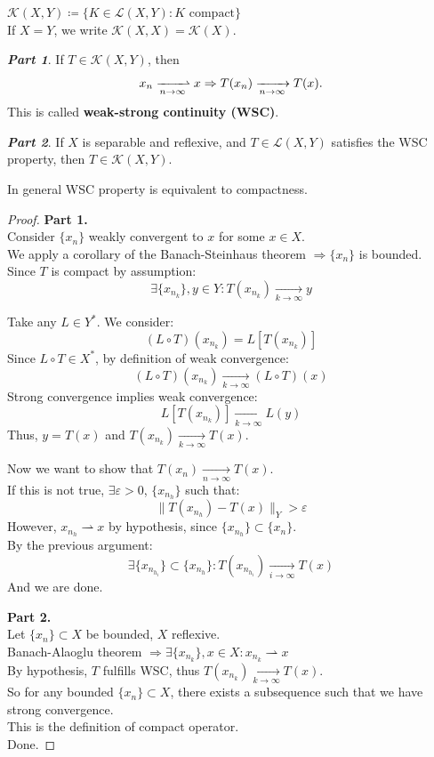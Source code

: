 \begin{definition}
$\mathcal{K}(X, Y) \coloneqq \{K \in \mathcal{L}(X, Y) : K \text{ compact}\}$ \\
If $X = Y$, we write $\mathcal{K}(X, X) = \mathcal{K}(X)$.
\end{definition}

\clearpage
\begin{theorem}
\textbf{\textit{Part 1}}. If $T \in \mathcal{K}(X, Y)$, then
\[
x_n \xrightharpoonup[n \to \infty]{} x \Rightarrow T(x_n) \xrightarrow[n \to \infty]{} T(x).
\]
This is called \textbf{weak-strong continuity (WSC)}.

\vspace{5pt}
\textbf{\textit{Part 2}}. If $X$ is separable and reflexive, and $T \in \mathcal{L}(X, Y)$ satisfies the WSC property, then $T \in \mathcal{K}(X, Y)$.
\end{theorem}

\begin{remark}
In general WSC property is equivalent to compactness.
\end{remark}

\begin{proof}
\textbf{Part 1.} \\
Consider $\{x_n\}$ weakly convergent to $x$ for some $x \in X$. \\
We apply a corollary of the Banach-Steinhaus theorem $\Rightarrow \{x_n\}$ is bounded. \\
Since $T$ is compact by assumption:
\[
\exists \{x_{n_k}\}, y \in Y : T(x_{n_k}) \xrightarrow[k \to \infty]{} y
\]

Take any $L \in Y^*$. We consider:
\[
(L \circ T)(x_{n_k}) = L[T(x_{n_k})]
\]
Since $L \circ T \in X^*$, by definition of weak convergence:
\[
(L \circ T)(x_{n_k}) \xrightarrow[k \to \infty]{} (L \circ T)(x)
\]
Strong convergence implies weak convergence:
\[
L[T(x_{n_k})] \xrightarrow[k \to \infty]{} L(y)
\]
Thus, $y = T(x)$ and $T(x_{n_k}) \xrightarrow[k \to \infty]{} T(x)$.

Now we want to show that $T(x_n) \xrightarrow[n \to \infty]{} T(x)$. \\
If this is not true, $\exists \varepsilon > 0$, $\{x_{n_h}\}$ such that:
\[
\|T(x_{n_h}) - T(x)\|_Y > \varepsilon
\]
However, $x_{n_h} \rightharpoonup x$ by hypothesis, since $\{x_{n_h}\} \subset \{x_n\}$. \\
By the previous argument:
\[
\exists \{x_{n_{h_i}}\} \subset \{x_{n_h}\} : T(x_{n_{h_i}}) \xrightarrow[i \to \infty]{} T(x)
\]
And we are done.

\textbf{Part 2.} \\
Let $\{x_n\} \subset X$ be bounded, $X$ reflexive. \\
Banach-Alaoglu theorem $\Rightarrow \exists \{x_{n_k}\}, x \in X : x_{n_k} \rightharpoonup x$ \\
By hypothesis, $T$ fulfills WSC, thus $T(x_{n_k}) \xrightarrow[k \to \infty]{} T(x)$. \\
So for any bounded $\{x_n\} \subset X$, there exists a subsequence such that we have strong convergence. \\
This is the definition of compact operator. \\
Done.
\end{proof}
